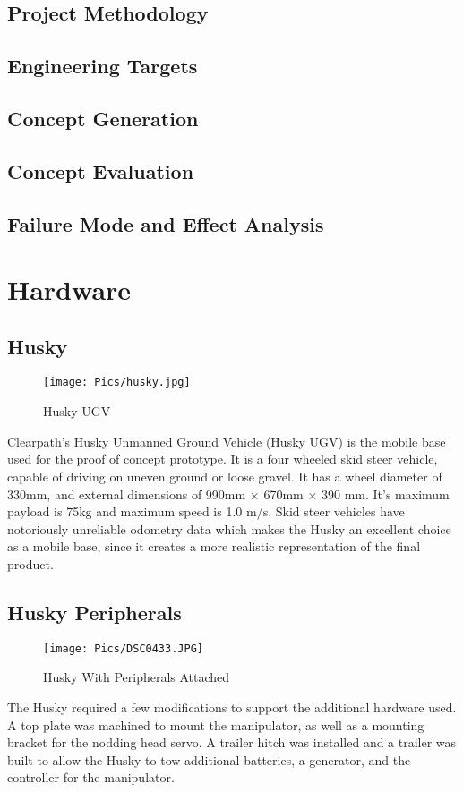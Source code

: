 \subsection{Project Methodology}
\subsection{Engineering Targets}
\subsection{Concept Generation}
\subsection{Concept Evaluation}
\subsection{Failure Mode and Effect Analysis}
\section{Hardware}
\subsection{Husky}
\begin{figure}[H]
    \centering
    \texttt{[image: Pics/husky.jpg]}
    \caption{Husky UGV \cite{huskypage}}
    \label{fig:husky}
\end{figure}
Clearpath's Husky Unmanned Ground Vehicle (Husky UGV) is the mobile base used for the proof of concept prototype. It is a four wheeled skid steer vehicle, capable of driving on uneven ground or loose gravel. It has a wheel diameter of 330mm, and external dimensions of 990mm $\times$ 670mm $\times$ 390 mm. It's maximum payload is 75kg and maximum speed is 1.0 m/s. Skid steer vehicles have notoriously unreliable odometry data which makes the Husky an excellent choice as a mobile base, since it creates a more realistic representation of the final product.\\
\subsection{Husky Peripherals}

\begin{figure}[H]
    \centering
    \texttt{[image: Pics/DSC0433.JPG]}
    \caption{Husky With Peripherals Attached}
    \label{fig:peripherals}
\end{figure}
The Husky required a few modifications to support the additional hardware used. A top plate was machined to mount the manipulator, as well as a mounting bracket for the nodding head servo. A trailer hitch was installed and a trailer was built to allow the Husky to tow additional batteries, a generator, and the controller for the manipulator.\\
